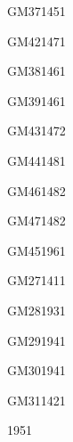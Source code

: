 \documentclass[a4paper,11pt]{report}
\begin{document}
\begin{exol}{GM37}{145}{1}      %
\end{exol}
\begin{exol}{GM42}{147}{1}      %
\end{exol}  

\begin{exol}{GM38}{146}{1}
\end{exol}
\begin{exol}{GM39}{146}{1}
\end{exol}
\begin{exol}{GM43}{147}{2}      %
\end{exol}
\begin{exol}{GM44}{148}{1}      %
\end{exol}
\begin{exol}{GM46}{148}{2}      %
\end{exol}
\begin{exol}{GM47}{148}{2}      %
\end{exol}
\begin{exof}{GM45}{196}{1}      %
\end{exof}      

\begin{exol}{GM27}{141}{1}      %
\end{exol}
\begin{exof}{GM28}{193}{1}      %
\end{exof}  
\begin{exof}{GM29}{194}{1}      %
\end{exof} 
\begin{exof}{GM30}{194}{1}      %
\end{exof}  
\begin{exol}{GM31}{142}{1}      %
\end{exol}
\begin{FLP}{195}{1}
\end{FLP}
\end{document}
